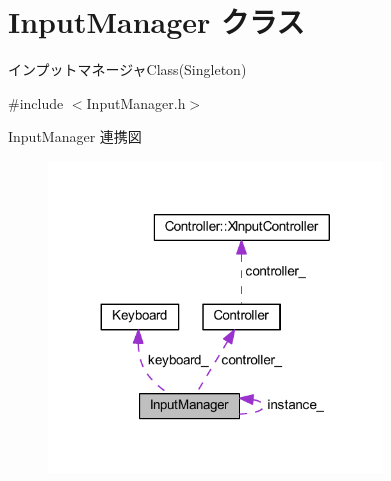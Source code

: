 \hypertarget{class_input_manager}{}\section{Input\+Manager クラス}
\label{class_input_manager}


インプットマネージャ\+Class(\+Singleton)  




{\ttfamily \#include $<$Input\+Manager.\+h$>$}



Input\+Manager 連携図\nopagebreak
\begin{figure}[H]
\begin{center}
\leavevmode
\includegraphics[width=251pt]{class_input_manager__coll__graph}
\end{center}
\end{figure}
